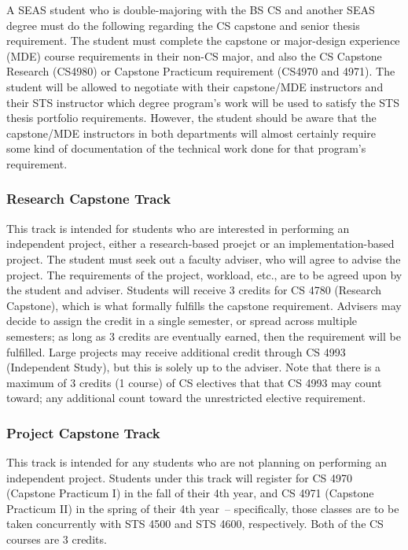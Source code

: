 \documentclass[10pt,letter]{book}
\begin{document}
A SEAS student who is double-majoring with the BS CS and another SEAS
degree must do the following regarding the CS capstone and senior
thesis requirement. The student must complete the capstone or
major-design experience (MDE) course requirements in their non-CS
major, and also the CS Capstone Research (CS4980) or Capstone
Practicum requirement (CS4970 and 4971). The student will be allowed
to negotiate with their capstone/MDE instructors and their STS
instructor which degree program's work will be used to satisfy
the STS thesis portfolio requirements. However, the student should be
aware that the capstone/MDE instructors in both departments will
almost certainly require some kind of documentation of the technical
work done for that program's requirement.

\subsubsection{Research Capstone Track}

This track is intended for students who are interested in performing
an independent project, either a research-based proejct or an
implementation-based project.  The student must seek out a faculty
adviser, who will agree to advise the project.  The requirements of
the project, workload, etc., are to be agreed upon by the student and
adviser.  Students will receive 3 credits for CS 4780 (Research
Capstone), which is what formally fulfills the capstone requirement.
Advisers may decide to assign the credit in a single semester, or
spread across multiple semesters; as long as 3 credits are eventually
earned, then the requirement will be fulfilled.  Large projects may
receive additional credit through CS 4993 (Independent Study), but
this is solely up to the adviser.  Note that there is a maximum of 3
credits (1 course) of CS electives that that CS 4993 may count toward;
any additional count toward the unrestricted elective requirement.

\subsubsection{Project Capstone Track}

This track is intended for any students who are not planning on
performing an independent project.  Students under this track will
register for CS 4970 (Capstone Practicum I) in the fall of their 4th
year, and CS 4971 (Capstone Practicum II) in the spring of their 4th
year~-- specifically, those classes are to be taken concurrently with
STS 4500 and STS 4600, respectively.  Both of the CS courses are 3
credits.
\end{document}
